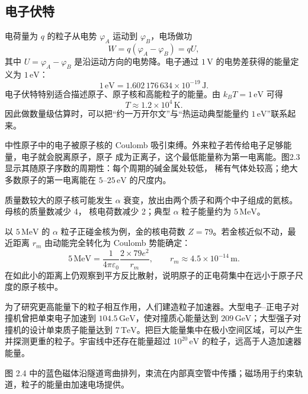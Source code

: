 \subsection*{电子伏特}

电荷量为 $q$ 的粒子从电势 $\varphi_A$ 运动到 $\varphi_B$，电场做功
\[
  W=q(\varphi_A-\varphi_B)=qU,
\]
其中 $U=\varphi_A-\varphi_B$ 是沿运动方向的电势降。电子通过 $1\,\mathrm V$ 的电势差获得的能量定义为
$1\,\mathrm{eV}$：
\begin{equation}
  \boxed{1\,\mathrm{eV}=1.602\,176\,634\times10^{-19}\,\mathrm J}.
\end{equation}
电子伏特特别适合描述原子、原子核和高能粒子的能量。由 $k_BT=1\,\mathrm{eV}$ 可得
\begin{equation}
  \boxed{T\approx1.2\times10^4\,\mathrm K}.
\end{equation}
因此做数量级估算时，可以把“约一万开尔文”与“热运动典型能量约 $1\,\mathrm{eV}$”联系起来。

中性原子中的电子被原子核的 Coulomb 吸引束缚。外来粒子若传给电子足够能量，电子就会脱离原子，原子
成为正离子，这个最低能量称为第一电离能。图2.3显示其随原子序数的周期性：每个周期的碱金属处较低，
稀有气体处较高；绝大多数原子的第一电离能在 $5$--$25\,\mathrm{eV}$ 的尺度内。

\ionizationEnergyFigure
{}

质量数较大的原子核可能发生 $\alpha$ 衰变，放出由两个质子和两个中子组成的氦核。母核的质量数减少 4，
核电荷数减少 2；典型 $\alpha$ 粒子能量约为 $5\,\mathrm{MeV}$。

\alphaDecayFigure

以 $5\,\mathrm{MeV}$ 的 $\alpha$ 粒子正碰金核为例，金的核电荷数 $Z=79$。若金核近似不动，最近距离
$r_m$ 由动能完全转化为 Coulomb 势能确定：
\[
  5\,\mathrm{MeV}
  =\frac{1}{4\pi\varepsilon_0}\frac{2\times79e^2}{r_m},
  \qquad r_m\approx4.5\times10^{-14}\,\mathrm m.
\]
在如此小的距离上仍观察到平方反比散射，说明原子的正电荷集中在远小于原子尺度的原子核中。

为了研究更高能量下的粒子相互作用，人们建造粒子加速器。大型电子--正电子对撞机曾把单束电子加速到
$104.5\,\mathrm{GeV}$，使对撞质心能量达到 $209\,\mathrm{GeV}$；大型强子对撞机的设计单束质子能量达到
$7\,\mathrm{TeV}$。把巨大能量集中在极小空间区域，可以产生并探测更重的粒子。宇宙线中还存在能量超过
$10^{20}\,\mathrm{eV}$ 的粒子，远高于人造加速器能量。

图 2.4 中的蓝色磁体沿隧道弯曲排列，束流在内部真空管中传播；磁场用于约束轨道，粒子的能量由加速电场提供。

